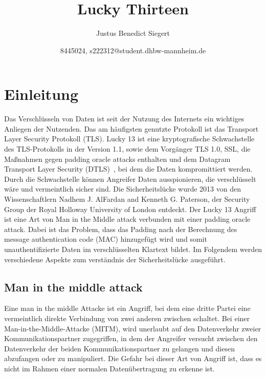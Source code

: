 \documentclass[a4paper,10pt]{scrartcl}
\begin{document}
    \title{Lucky Thirteen}
    \author{Justus Benedict Siegert}
    \date{8445024, s222312@student.dhbw-mannheim.de}
    \maketitle
    \tableofcontents
    \newpage


    \section{Einleitung}\label{sec:einleitung}
    Das Verschlüsseln von Daten ist seit der Nutzung des Internets ein wichtiges Anliegen der Nutzenden.
    Das am häufigsten genutzte Protokoll ist das Transport Layer Security Protokoll (TLS).
    Lucky 13 ist eine kryptografische Schwachstelle des TLS-Protokolls in der Version 1.1, sowie dem Vorgänger TLS 1.0, SSL, die Maßnahmen gegen padding oracle attacks enthalten und dem Datagram Transport Layer Security (DTLS)~\cite[S.2]{AlFardan2013},
    bei dem die Daten kompromittiert werden.
    Durch die Schwachstelle können Angreifer Daten ausspionieren, die verschlüsselt wäre und vermeintlich sicher sind.
    Die Sicherheitslücke wurde 2013 von den Wissenschaftlern Nadhem J. AlFardan and Kenneth G. Paterson, der Security Group der Royal Holloway University of London entdeckt.
    \newline
    Der Lucky 13 Angriff ist eine Art von Man in the Middle attack verbunden mit einer padding oracle attack.
    Dabei ist das Problem, dass das Padding nach der Berechnung des message authentication code (MAC) hinzugefügt wird und somit unauthentifizierte Daten im verschlüsselten Klartext bildet.
    Im Folgendem werden verschiedene Aspekte zum verständnis der Sicherheitslücke ausgeführt.

    \subsection{Man in the middle attack}\label{subsec:man-in-the-middle-attack}
    Eine man in the middle Attacke ist ein Angriff, bei dem eine dritte Partei eine vermeintlich direkte Verbindung von zwei anderen zwischen schaltet.
    Bei einer Man-in-the-Middle-Attacke (MITM), wird unerlaubt auf den Datenverkehr zweier Kommunikationspartner zugegriffen, in dem der Angreifer versucht zwischen den Datenverkehr der beiden Kommunikationspartner zu gelangen und diesen abzufangen oder zu manipuliert.
    Die Gefahr bei dieser Art von Angriff ist, dass es nicht im Rahmen einer normalen Datenübertragung zu erkenne ist.
\end{document}
